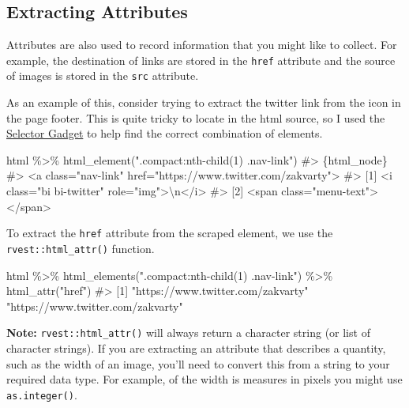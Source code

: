 \documentclass[
  letterpaper,
  DIV=11,
  numbers=noendperiod]{scrreprt}
\newenvironment{Shaded}{\begin{snugshade}}{\end{snugshade}}
\newcommand{\CommentTok}[1]{\textcolor[rgb]{0.37,0.37,0.37}{#1}}
\newcommand{\FunctionTok}[1]{\textcolor[rgb]{0.28,0.35,0.67}{#1}}
\newcommand{\NormalTok}[1]{\textcolor[rgb]{0.00,0.23,0.31}{#1}}
\newcommand{\SpecialCharTok}[1]{\textcolor[rgb]{0.37,0.37,0.37}{#1}}
\newcommand{\StringTok}[1]{\textcolor[rgb]{0.13,0.47,0.30}{#1}}
\begin{document}
\subsection{Extracting Attributes}\label{extracting-attributes}

Attributes are also used to record information that you might like to
collect. For example, the destination of links are stored in the
\texttt{href} attribute and the source of images is stored in the
\texttt{src} attribute.

As an example of this, consider trying to extract the twitter link from
the icon in the page footer. This is quite tricky to locate in the html
source, so I used the
\href{https://rvest.tidyverse.org/articles/selectorgadget.html}{Selector
Gadget} to help find the correct combination of elements.

\begin{Shaded}
\begin{Highlighting}[]
\NormalTok{html }\SpecialCharTok{\%\textgreater{}\%} \FunctionTok{html\_element}\NormalTok{(}\StringTok{".compact:nth{-}child(1) .nav{-}link"}\NormalTok{)}
\CommentTok{\#\textgreater{} \{html\_node\}}
\CommentTok{\#\textgreater{} \textless{}a class="nav{-}link" href="https://www.twitter.com/zakvarty"\textgreater{}}
\CommentTok{\#\textgreater{} [1] \textless{}i class="bi bi{-}twitter" role="img"\textgreater{}\textbackslash{}n\textless{}/i\textgreater{}}
\CommentTok{\#\textgreater{} [2] \textless{}span class="menu{-}text"\textgreater{}\textless{}/span\textgreater{}}
\end{Highlighting}
\end{Shaded}

To extract the \texttt{href} attribute from the scraped element, we use
the \texttt{rvest::html\_attr()} function.

\begin{Shaded}
\begin{Highlighting}[]
\NormalTok{html }\SpecialCharTok{\%\textgreater{}\%} 
  \FunctionTok{html\_elements}\NormalTok{(}\StringTok{".compact:nth{-}child(1) .nav{-}link"}\NormalTok{) }\SpecialCharTok{\%\textgreater{}\%} 
  \FunctionTok{html\_attr}\NormalTok{(}\StringTok{"href"}\NormalTok{)}
\CommentTok{\#\textgreater{} [1] "https://www.twitter.com/zakvarty" "https://www.twitter.com/zakvarty"}
\end{Highlighting}
\end{Shaded}

\textbf{Note:} \texttt{rvest::html\_attr()} will always return a
character string (or list of character strings). If you are extracting
an attribute that describes a quantity, such as the width of an image,
you'll need to convert this from a string to your required data type.
For example, of the width is measures in pixels you might use
\texttt{as.integer()}.
\end{document}
